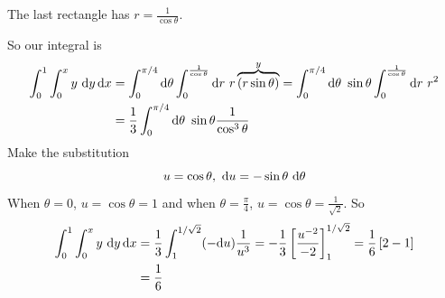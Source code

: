 {\begin{eg}
\begin{itemize}
\begin{itemize}
The last rectangle has $r=\frac{1}{\cos\theta}$.
\end{itemize}
\vspace{-\topsep}
\end{itemize}
So our integral is
\begin{align*}
\int_0^1\int_0^x y\ \dee{y}\,\dee{x}
&=\int_0^{\pi/4}\dee{\theta}\int_0^{\frac{1}{\cos\theta}}\dee{r}\ 
     r\overbrace{(r\sin\theta)}^{y}
=\int_0^{\pi/4}\dee{\theta}\ \sin\theta\int_0^{\frac{1}{\cos\theta}}\dee{r}\ 
     r^2 \\
&=\frac{1}{3}\int_0^{\pi/4}\dee{\theta}\ \sin\theta\frac{1}{\cos^3\theta} 
\end{align*}
Make the substitution
\begin{equation*}
u=\cos\theta,\ \dee{u}=-\sin\theta\ \dee{\theta}
\end{equation*}
When $\theta=0$, $u=\cos\theta=1$ and when $\theta=\frac{\pi}{4}$,
$u=\cos\theta=\frac{1}{\sqrt{2}}$. So
\begin{align*}
\int_0^1\int_0^x y\ \mathrm{d}y\,\mathrm{d}x
&=\frac{1}{3}\int_1^{1/\sqrt{2}} (-\mathrm{d}u)\frac{1}{u^3} 
=-\frac{1}{3}\left[\frac{u^{-2}}{-2}\right]_1^{1/\sqrt{2}} 
=\frac{1}{6}\left[2-1\right]\\
&=\frac{1}{6}
\end{align*}


\end{eg}
}

